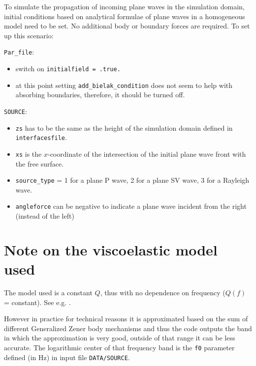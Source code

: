 To simulate the propagation of incoming plane waves in the simulation domain, initial conditions based on analytical formulae of plane waves in a homogeneous model need to be set. No additional body or boundary forces are required. To set up this scenario:
%
\begin{description}
\item{\verb+Par_file+:}
  \begin{itemize}
  \item switch on \verb+initialfield = .true. +
  \item at this point setting \verb+add_bielak_condition+ does not seem to help with absorbing boundaries, therefore, it should be turned off.
  \end{itemize}
\item{\verb+SOURCE+:}
  \begin{itemize}
  \item \verb+zs+ has to be the same as the height of the simulation domain defined in \verb+interfacesfile+.
  \item \verb+xs+ is the $x$-coordinate of the intersection of the initial plane wave front with the free surface.
  \item \verb+source_type+ = 1 for a plane P wave, 2 for a plane SV wave, 3 for a Rayleigh wave.
  \item \verb+angleforce+ can be negative to indicate a plane wave incident from the right (instead of the left)
  \end{itemize}
\end{description}


\section{Note on the viscoelastic model used}

\noindent
The model used is a constant $Q$, thus with no dependence on frequency ($Q(f)$ = constant).
See e.g. \cite{BlKoChLoXi16}. \newline

\noindent
However in practice for technical reasons it is approximated based on the sum of different Generalized Zener body mechanisms
and thus the code outputs the band in which the approximation is very good, outside of that range it can be less accurate.
The logarithmic center of that frequency band is the \texttt{f0} parameter defined (in Hz) in input file \texttt{DATA/SOURCE}.


